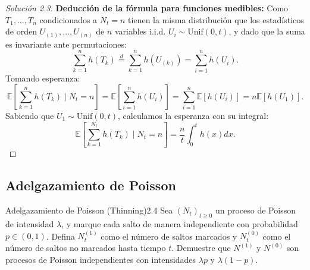 \documentclass[10pt,a4paper]{article}
\begin{document}
\begin{proof}[Solución 2.3]
    \textbf{Deducción de la fórmula para funciones medibles:}
    Como $T_1, \dots, T_n$ condicionados a $N_t=n$ tienen la misma distribución que los estadísticos de orden $U_{(1)}, \dots, U_{(n)}$ de $n$ variables i.i.d. $U_i \sim \text{Unif}(0,t)$, y dado que la suma es invariante ante permutaciones:
    \[ \sum_{k=1}^n h(T_k) \stackrel{d}{=} \sum_{k=1}^n h(U_{(k)}) = \sum_{i=1}^n h(U_i). \]
    Tomando esperanza:
    \[ \mathbb{E}\left[ \sum_{k=1}^n h(T_k) \mid N_t = n \right] = \mathbb{E}\left[ \sum_{i=1}^n h(U_i) \right] = \sum_{i=1}^n \mathbb{E}[h(U_i)] = n \mathbb{E}[h(U_1)]. \]
    Sabiendo que $U_1 \sim \text{Unif}(0,t)$, calculamos la esperanza con su integral:
    \[ \mathbb{E}\left[ \sum_{k=1}^{N_t} h(T_k) \mid N_t = n \right] = \frac{n}{t} \int_0^t h(x) dx. \]
\end{proof}

\newpage

\subsection{Adelgazamiento de Poisson}

\begin{ejercicio}{Adelgazamiento de Poisson (Thinning)}{2.4}
    Sea $(N_t)_{t\ge 0}$ un proceso de Poisson de intensidad $\lambda$, y marque cada salto de manera independiente con probabilidad $p \in (0,1)$. Defina $N_t^{(1)}$ como el número de saltos marcados y $N_t^{(0)}$ como el número de saltos no marcados hasta tiempo $t$. Demuestre que $N^{(1)}$ y $N^{(0)}$ son procesos de Poisson independientes con intensidades $\lambda p$ y $\lambda(1-p)$.
\end{ejercicio}
\end{document}
